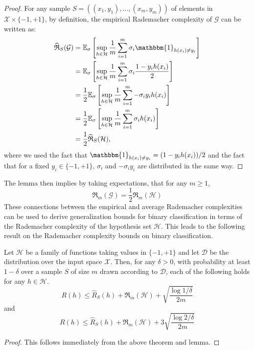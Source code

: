 \begin{proof}
    For any sample $S = ((x_1, y_1), \dots, (x_m, y_m))$ of elements in $\mathcal{X} \times \{-1, +1\}$, by definition, the empirical Rademacher complexity of $\mathcal{G}$ can be written as:
\begin{align*}
\widehat{\mathfrak{R}}_S(\mathcal{G}) 
&= \mathbb{E}_\sigma \left[ \sup_{h \in \mathcal{H}} \frac{1}{m} \sum_{i=1}^m \sigma_i \mathbbm{1}_{h(x_i) \ne y_i} \right] \\
&= \mathbb{E}_\sigma \left[ \sup_{h \in \mathcal{H}} \frac{1}{m} \sum_{i=1}^m \sigma_i \frac{1 - y_i h(x_i)}{2} \right] \\
&= \frac{1}{2} \mathbb{E}_\sigma \left[ \sup_{h \in \mathcal{H}} \frac{1}{m} \sum_{i=1}^m -\sigma_i y_i h(x_i) \right] \\
&= \frac{1}{2} \mathbb{E}_\sigma \left[ \sup_{h \in \mathcal{H}} \frac{1}{m} \sum_{i=1}^m \sigma_i h(x_i) \right] \\
&= \frac{1}{2} \widehat{\mathfrak{R}}_S(\mathcal{H}),
\end{align*}
where we used the fact that $\mathbbm{1}_{h(x_i) \ne y_i} = (1 - y_i h(x_i))/2$ and the fact that for a fixed $y_i \in \{-1, +1\}$, $\sigma_i$ and $-\sigma_i y_i$ are distributed in the same way.

\end{proof}

The lemma then implies by taking expectations, that for any $m\geq 1$, 
\begin{equation}
    \mathfrak{R}_{m}(\mathcal{G}) = \frac{1}{2} \mathfrak{R}_{m}(\mathcal{H})
\end{equation}
These connections between the empirical and average Rademacher complexities can be used to derive generalization bounds for binary classification in terms of the Rademacher complexity of the hypothesis set $\mathcal{H}$. This leads to the following result on the Rademacher complexity bounds on binary classification. 

\begin{theorem}
    Let $\mathcal{H}$ be a family of functions taking values in $\{-1,+1\}$ and let $\mathcal{D}$ be the distribution over the input space $\mathcal{X}$. Then, for any $\delta > 0$, with probability at least $1-\delta$ over a sample $S$ of size $m$ drawn according to $\mathcal{D}$, each of the following holds for any $h\in \mathcal{H}$. 
    \begin{equation}
        R(h) \leq \hat{R}_{S}(h) + \mathfrak{R}_{m}(\mathcal{H}) + \sqrt{\frac{\log{1/\delta}}{2m}}
    \end{equation}
    and 
    \begin{equation}
        R(h) \leq \hat{R}_{S}(h) + \mathfrak{R}_{m}(\mathcal{H}) + 3\sqrt{\frac{\log{2/\delta}}{2m}}
    \end{equation}
\end{theorem}
\begin{proof}
    This follows immediately from the above theorem and lemma. 
\end{proof}

